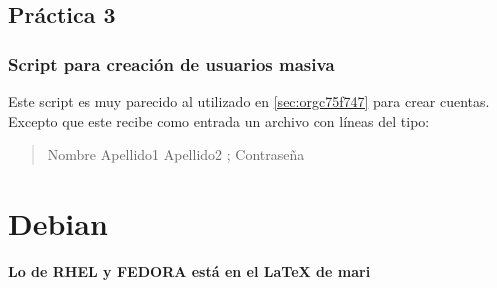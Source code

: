 \documentclass[11pt, letterpaper]{article}
\begin{document}
\subsection{Práctica 3}
\label{sec:org3e6faf9}

\subsubsection{Script para creación de usuarios masiva}
\label{sec:org7af23ae}

Este script es muy parecido al utilizado en \ref{sec:orgc75f747} para crear cuentas. Excepto que este recibe como entrada un archivo con líneas del tipo:

\begin{quote}
Nombre Apellido1 Apellido2 ; Contraseña
\end{quote}
\subsection{}
\label{sec:orge82c872}
\section{Debian}
\label{sec:org5e963e0}

\textbf{Lo de RHEL y FEDORA está en el \LaTeX{} de mari}
\end{document}
